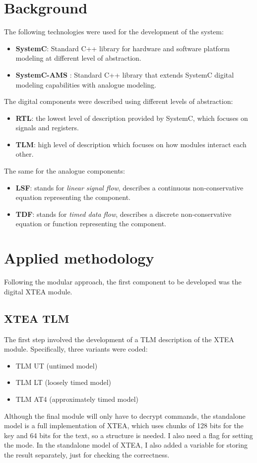 \documentclass[]{IEEEtran}
\begin{document}
\section{Background}
The following technologies were used for the development of the system:
\begin{itemize}
\item \textbf{SystemC}\cite{SystemC}: Standard C++ library for hardware and software platform modeling at different level of abstraction.
\item \textbf{SystemC-AMS} \cite{SystemC-AMS}: Standard C++ library that extends SystemC digital modeling capabilities with analogue modeling.
\end{itemize}
The digital components were described using different levels of abstraction:
\begin{itemize}
    \item \textbf{RTL}: the lowest level of description provided by SystemC, which focuses on signals and registers.
    \item \textbf{TLM}: high level of description which focuses on how modules interact each other.
\end{itemize}
The same for the analogue components:
\begin{itemize}
    \item \textbf{LSF}: stands for \textit{linear signal flow}, describes a continuous non-conservative equation representing the component.
    \item \textbf{TDF}: stands for \textit{timed data flow}, describes a discrete non-conservative equation or function representing the component.
\end{itemize}

\section{Applied methodology}
Following the modular approach, the first component to be developed was the digital XTEA module.

\subsection{XTEA TLM}
The first step involved the development of a TLM description of the XTEA module. Specifically, three variants were coded:
\begin{itemize}
    \item TLM UT (untimed model)
    \item TLM LT (loosely timed model)
    \item TLM AT4 (approximately timed model)
\end{itemize}
Although the final module will only have to decrypt commands, the standalone model is a full implementation of XTEA, which
uses chunks of 128 bits for the key and 64 bits for the text, so a structure is needed. I also need a flag for setting the mode.
In the standalone model of XTEA, I also added a variable for storing the result separately, just for checking the correctness.
\end{document}
